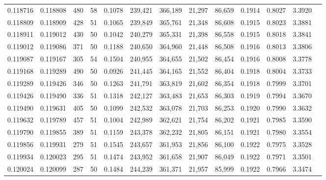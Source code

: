 \begin{tabular}{rrrrrrrrrrrrr}
0.118716 & 0.118808 &   480 &  58 &                                     0.1078 & 239,421 & 366,189 &  21,297 &  86,659 & 0.1914 & 0.8027 & 3.3920 \\
0.118809 & 0.118909 &   428 &  51 &                                     0.1065 & 239,849 & 365,761 &  21,348 &  86,608 & 0.1915 & 0.8023 & 3.3881 \\
0.118911 & 0.119012 &   430 &  50 &                                     0.1042 & 240,279 & 365,331 &  21,398 &  86,558 & 0.1915 & 0.8018 & 3.3841 \\
0.119012 & 0.119086 &   371 &  50 &                                     0.1188 & 240,650 & 364,960 &  21,448 &  86,508 & 0.1916 & 0.8013 & 3.3806 \\
0.119087 & 0.119167 &   305 &  54 &                                     0.1504 & 240,955 & 364,655 &  21,502 &  86,454 & 0.1916 & 0.8008 & 3.3778 \\
0.119168 & 0.119289 &   490 &  50 &                                     0.0926 & 241,445 & 364,165 &  21,552 &  86,404 & 0.1918 & 0.8004 & 3.3733 \\
0.119289 & 0.119426 &   346 &  50 &                                     0.1263 & 241,791 & 363,819 &  21,602 &  86,354 & 0.1918 & 0.7999 & 3.3701 \\
0.119426 & 0.119490 &   336 &  51 &                                     0.1318 & 242,127 & 363,483 &  21,653 &  86,303 & 0.1919 & 0.7994 & 3.3670 \\
0.119490 & 0.119631 &   405 &  50 &                                     0.1099 & 242,532 & 363,078 &  21,703 &  86,253 & 0.1920 & 0.7990 & 3.3632 \\
0.119632 & 0.119789 &   457 &  51 &                                     0.1004 & 242,989 & 362,621 &  21,754 &  86,202 & 0.1921 & 0.7985 & 3.3590 \\
0.119790 & 0.119855 &   389 &  51 &                                     0.1159 & 243,378 & 362,232 &  21,805 &  86,151 & 0.1921 & 0.7980 & 3.3554 \\
0.119856 & 0.119931 &   279 &  51 &                                     0.1545 & 243,657 & 361,953 &  21,856 &  86,100 & 0.1922 & 0.7975 & 3.3528 \\
0.119934 & 0.120023 &   295 &  51 &                                     0.1474 & 243,952 & 361,658 &  21,907 &  86,049 & 0.1922 & 0.7971 & 3.3501 \\
0.120024 & 0.120099 &   287 &  50 &                                     0.1484 & 244,239 & 361,371 &  21,957 &  85,999 & 0.1922 & 0.7966 & 3.3474 \\

\end{tabular}
